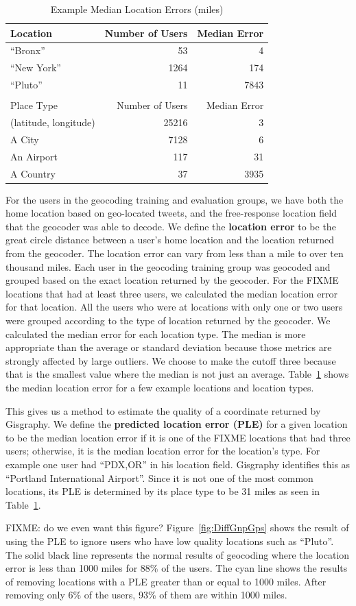 \begin{table}[t]
\centering
\caption{Example Median Location Errors (miles)}
\begin{tabular}{l r r} 
Location&Number of Users&Median Error\\ \hline
``Bronx''&53&4\\
``New York''&1264&174\\
``Pluto''&11&7843\\ \hline
\\
Place Type&Number of Users&Median Error\\ \hline
(latitude, longitude)&25216&3\\
A City&7128&6\\
An Airport&117&31\\
A Country&37&3935\\
\hline\end{tabular}
\label{tab:MedianLocErr}
\end{table}

For the users in the geocoding training and evaluation groups, we have both the
home location based on geo-located tweets, and the free-response location field
that the geocoder was able to decode.
We define the \textbf{location error} to be the great circle distance between a
user's home location and the location returned from the geocoder.
The location error can vary from less than a mile to over ten thousand miles.
Each user in the geocoding training group was geocoded and grouped based on the
exact location returned by the geocoder.
For the FIXME locations that had at least three users, we calculated the median
location error for that location.
All the users who were at locations with only one or two users were grouped
according to the type of location returned by the geocoder.
We calculated the median error for each location type.
The median is more appropriate than the average or standard deviation because
those metrics are strongly affected by large outliers.
We choose to make the cutoff three because that is the smallest value where the
median is not just an average.
Table~\ref{tab:MedianLocErr} shows the median location error for a few example
locations and location types.

This gives us a method to estimate the quality of a coordinate returned by
Gisgraphy.
We define the \textbf{predicted location error (PLE)} for a given location to
be the median location error if it is one of the FIXME locations that had three
users; otherwise, it is the median location error for the location's type.
For example one user had ``PDX,OR'' in his location field. Gisgraphy identifies
this as ``Portland International Airport''. Since it is not one of the most
common locations, its PLE is determined by its place type to be 31 miles as
seen in Table~\ref{tab:MedianLocErr}.

FIXME: do we even want this figure?
Figure~\ref{fig:DiffGnpGps} shows the result of using the PLE to ignore users
who have low quality locations such as ``Pluto''.
The solid black line represents the normal results of geocoding where the
location error is less than 1000 miles for 88\% of the users.
The cyan line shows the results of removing locations with a PLE greater than
or equal to 1000 miles.
After removing only 6\% of the users, 93\% of them are within 1000 miles.
